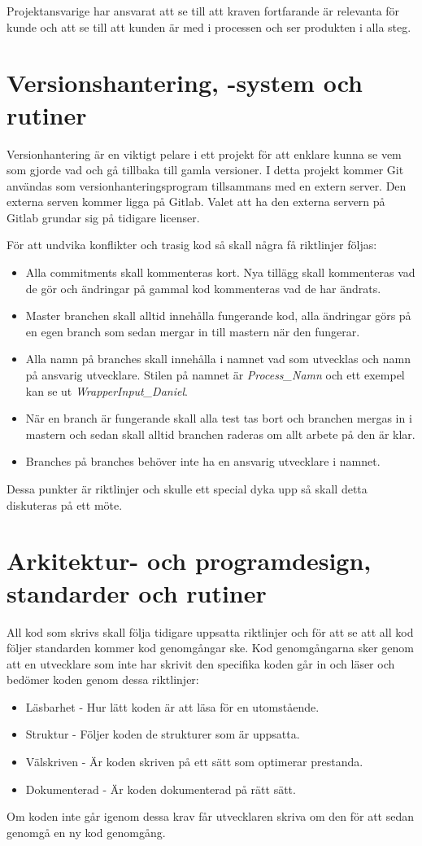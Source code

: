 \documentclass[a4paper,12pt,oneside,final]{extbook}
\begin{document}
Projektansvarige har ansvarat att se till att kraven fortfarande är relevanta för kunde och att se till att kunden är med i processen och ser produkten i alla steg.

\section{Versionshantering, -system och rutiner}
Versionhantering är en viktigt pelare i ett projekt för att enklare kunna se vem som gjorde vad och gå tillbaka till gamla versioner. I detta projekt kommer Git användas som versionhanteringsprogram tillsammans med en extern server. Den externa serven kommer ligga på Gitlab. Valet att ha den externa servern på Gitlab grundar sig på tidigare licenser.

För att undvika konflikter och trasig kod så skall några få riktlinjer följas:
\begin{itemize}
	\item Alla commitments skall kommenteras kort. Nya tillägg skall kommenteras vad de gör och ändringar på gammal kod kommenteras vad de har ändrats. 
	\item Master branchen skall alltid innehålla fungerande kod, alla ändringar görs på en egen branch som sedan mergar in till mastern när den fungerar.
	\item Alla namn på branches skall innehålla i namnet vad som utvecklas och namn på ansvarig utvecklare. Stilen på namnet är \textit{Process\_Namn} och ett exempel kan se ut \textit{WrapperInput\_Daniel}.
	\item När en branch är fungerande skall alla test tas bort och branchen mergas in i mastern och sedan skall alltid branchen raderas om allt arbete på den är klar.
	\item Branches på branches behöver inte ha en ansvarig utvecklare i namnet. 
\end{itemize}

Dessa punkter är riktlinjer och skulle ett special dyka upp så skall detta diskuteras på ett möte.


\section{Arkitektur- och programdesign, standarder och rutiner}
All kod som skrivs skall följa tidigare uppsatta riktlinjer och för att se att all kod följer standarden kommer kod genomgångar ske. Kod genomgångarna sker genom att en utvecklare som inte har skrivit den specifika koden går in och läser och bedömer koden genom dessa riktlinjer:
  \begin{itemize}
  	\item Läsbarhet - Hur lätt koden är att läsa för en utomstående.
  	\item Struktur - Följer koden de strukturer som är uppsatta.
  	\item Välskriven - Är koden skriven på ett sätt som optimerar prestanda.
  	\item Dokumenterad - Är koden dokumenterad på rätt sätt.
  \end{itemize}
Om koden inte går igenom dessa krav får utvecklaren skriva om den för att sedan genomgå en ny kod genomgång.
\end{document}
